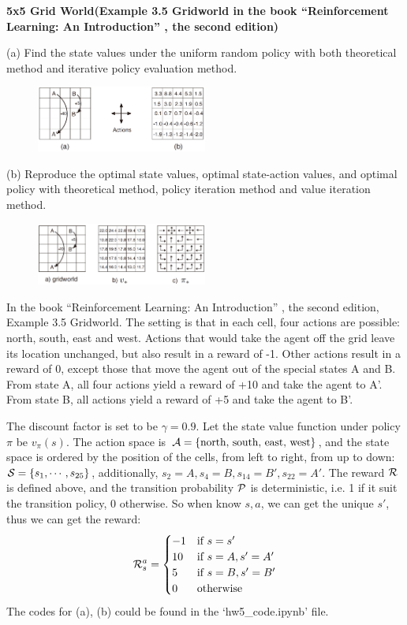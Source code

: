 \begin{homeworkProblem}
\textbf{5x5 Grid World(Example 3.5 Gridworld in the book “Reinforcement Learning: An Introduction” , the second edition)}

(a) Find the state values under the uniform random policy with both theoretical method and iterative policy evaluation method.
\begin{figure}[h]
    \centering
    \includegraphics[width=0.5\textwidth]{./figure/grid1.png}
\end{figure}

(b) Reproduce the optimal state values, optimal state-action values, and optimal policy with theoretical method, policy iteration method and value iteration method.
\begin{figure}[h]
    \centering
    \includegraphics[width=0.5\textwidth]{./figure/grid2.png}
\end{figure}

\solution

In the book “Reinforcement Learning: An Introduction” , the second edition, Example 3.5 Gridworld. The setting is that in each cell, four actions are possible: north, south, east and west. Actions that would take the agent off the grid leave its location unchanged, but also result in a reward of -1. Other actions result in a reward of 0, except those that move the agent out of the special states A and B. From state A, all four actions yield a reward of +10 and take the agent to A'. From state B, all actions yield a reward of +5 and take the agent to B'.

The discount factor is set to be $\gamma=0.9$. Let the state value function under policy $\pi$ be $v_{\pi}(s)$. The action space is $\mathcal{A}=\text{\{north, south, east, west\}}$, and the state space is ordered by the position of the cells, from left to right, from up to down: $\mathcal{S}=\{s_1,\cdots,s_{25}\}$, additionally, $s_2=A, s_4=B, s_{14}=B', s_{22}=A'$. The reward $\mathcal{R}$ is defined above, and the transition probability $\mathcal{P}$ is deterministic, i.e. 1 if it suit the transition policy, 0 otherwise. So when know $s,a$, we can get the unique $s'$, thus we can get the reward:
$$\mathcal{R}_s^a=\begin{cases}
-1 & \text{if } s=s' \\
10 & \text{if } s=A, s'=A' \\
5 & \text{if } s=B, s'=B' \\
0 & \text{otherwise}
\end{cases}$$
The codes for (a), (b) could be found in the `hw5\_code.ipynb' file.


\end{homeworkProblem}
